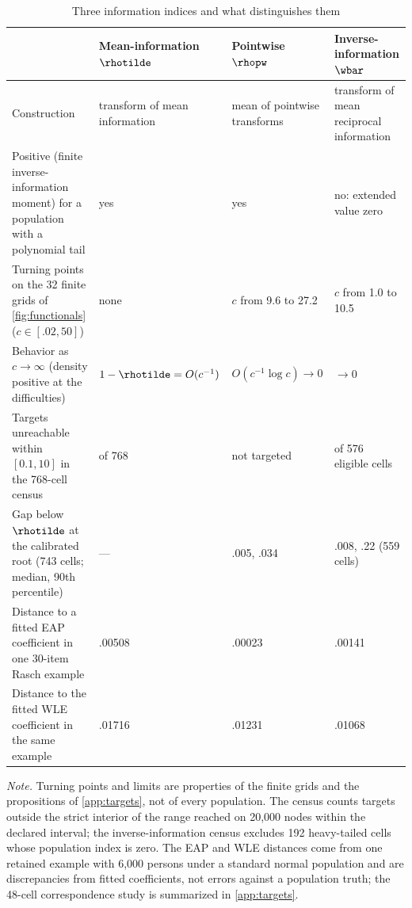 \begin{table}[!htb]
\centering
\caption{Three information indices and what distinguishes them}
\label{tab:indices}
\footnotesize
\setlength{\tabcolsep}{4pt}
\begin{tabular}{@{}>{\raggedright\arraybackslash}p{4.3cm}>{\raggedright\arraybackslash}p{2.9cm}>{\raggedright\arraybackslash}p{2.9cm}>{\raggedright\arraybackslash}p{3.1cm}@{}}
\toprule
 & Mean-information $\rhotilde$ & Pointwise $\rhopw$ & Inverse-information $\wbar$ \\
\midrule
Construction & transform of mean information & mean of pointwise transforms & transform of mean reciprocal information \\
\addlinespace
Positive (finite inverse-information moment) for a population with a polynomial tail & yes & yes & no: extended value zero \\
\addlinespace
Turning points on the 32 finite grids of \cref{fig:functionals} ($c\in[.02,50]$) & none & $c$ from 9.6 to 27.2 & $c$ from 1.0 to 10.5 \\
\addlinespace
Behavior as $c\to\infty$ (density positive at the difficulties) & $1-\rhotilde=O(c^{-1})$ & $O(c^{-1}\log c)\to0$ & $\to0$ \\
\addlinespace
Targets unreachable within $[0.1,10]$ in the 768-cell census & 20 of 768 & not targeted & 167 of 576 eligible cells \\
\addlinespace
Gap below $\rhotilde$ at the calibrated root (743 cells; median, 90th percentile) & --- & .005, .034 & .008, .22 (559 cells) \\
\addlinespace
Distance to a fitted EAP coefficient in one 30-item Rasch example & .00508 & .00023 & .00141 \\
Distance to the fitted WLE coefficient in the same example & .01716 & .01231 & .01068 \\
\bottomrule
\end{tabular}

\smallskip
\begin{minipage}{0.95\textwidth}
\footnotesize
\emph{Note.} Turning points and limits are properties of the finite grids and the propositions of \cref{app:targets}, not of every population. The census counts targets outside the strict interior of the range reached on 20,000 nodes within the declared interval; the inverse-information census excludes 192 heavy-tailed cells whose population index is zero. The EAP and WLE distances come from one retained example with 6,000 persons under a standard normal population and are discrepancies from fitted coefficients, not errors against a population truth; the 48-cell correspondence study is summarized in \cref{app:targets}.
\end{minipage}
\end{table}
